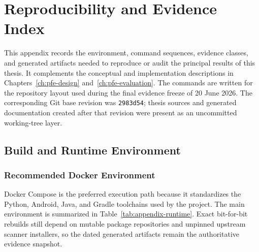 \chapter{Reproducibility and Evidence Index}
\label{app:pfe-reproducibility}

This appendix records the environment, command sequences, evidence classes,
and generated artifacts needed to reproduce or audit the principal results of
this thesis. It complements the conceptual and implementation descriptions in
Chapters~\ref{ch:pfe-design} and~\ref{ch:pfe-evaluation}.
The commands are written for the repository layout used during the final
evidence freeze of 20 June 2026. The corresponding Git base revision was
\texttt{2983d54}; thesis sources and generated documentation created after
that revision were present as an uncommitted working-tree layer.

\section{Build and Runtime Environment}

\subsection{Recommended Docker Environment}

Docker Compose is the preferred execution path because it standardizes the
Python, Android, Java, and Gradle toolchains used by the project. The main
environment is summarized in Table~\ref{tab:appendix-runtime}. Exact
bit-for-bit rebuilds still depend on mutable package repositories and
unpinned upstream scanner installers, so the dated generated artifacts remain
the authoritative evidence snapshot.

